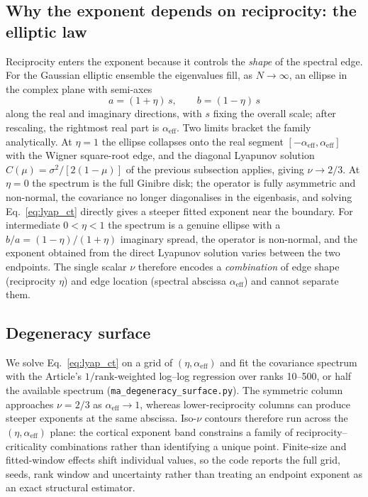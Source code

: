 \documentclass[11pt]{article}
\newcommand{\alphaeff}{\alpha_{\mathrm{eff}}}
\begin{document}
\subsection{Why the exponent depends on reciprocity: the elliptic law}
Reciprocity enters the exponent because it controls the \emph{shape} of the
spectral edge. For the Gaussian elliptic ensemble the eigenvalues fill, as
$N\to\infty$, an ellipse in the complex plane with semi-axes
\begin{equation}
a=(1+\eta)\,s,\qquad b=(1-\eta)\,s
\end{equation}
along the real and imaginary directions, with $s$ fixing the overall
scale\cite{sommers1988}; after rescaling, the rightmost real part is
$\alphaeff$. Two limits bracket the family analytically. At $\eta=1$ the
ellipse collapses onto the real segment $[-\alphaeff,\alphaeff]$ with
the Wigner square-root edge, and the diagonal Lyapunov solution
$C(\mu)=\sigma^2/[2(1-\mu)]$ of the previous subsection applies, giving
$\nu\to2/3$. At $\eta=0$ the spectrum is the full Ginibre disk; the operator is
fully asymmetric and non-normal, the covariance no longer diagonalises in the
eigenbasis,
and solving Eq.~\eqref{eq:lyap_ct} directly gives a steeper fitted exponent
near the boundary. For intermediate $0<\eta<1$ the spectrum is a genuine
ellipse with a $b/a=(1-\eta)/(1+\eta)$ imaginary spread, the operator is
non-normal, and the exponent obtained from the direct Lyapunov solution
varies between the two endpoints. The single scalar $\nu$
therefore encodes a \emph{combination} of edge shape (reciprocity $\eta$) and
edge location (spectral abscissa $\alphaeff$) and cannot separate them.

\subsection{Degeneracy surface}
We solve Eq.~\eqref{eq:lyap_ct} on a grid of $(\eta,\alphaeff)$ and fit the
covariance spectrum with the Article's $1/\mathrm{rank}$-weighted log--log
regression over ranks 10--500, or half the available spectrum
(\texttt{ma\_degeneracy\_surface.py}). The symmetric column approaches
$\nu=2/3$ as $\alphaeff\to1$, whereas lower-reciprocity columns can produce
steeper exponents at the same abscissa. Iso-$\nu$ contours therefore run across
the $(\eta,\alphaeff)$ plane: the cortical exponent band constrains a family of
reciprocity--criticality combinations rather than identifying a unique point.
Finite-size and fitted-window effects shift individual values, so the code
reports the full grid, seeds, rank window and uncertainty rather than treating
an endpoint exponent as an exact structural estimator.
\end{document}
